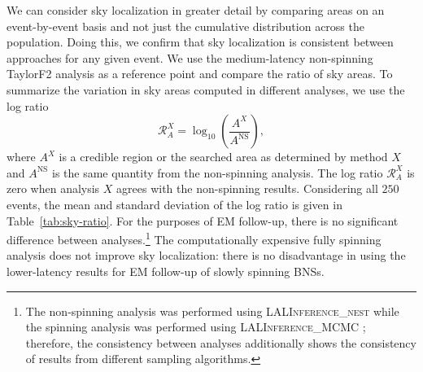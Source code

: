 We can consider sky localization in greater detail by comparing areas on an event-by-event basis and not just the cumulative distribution across the population. Doing this, we confirm that sky localization is consistent between approaches for any given event. We use the medium-latency non-spinning TaylorF2 analysis as a reference point and compare the ratio of sky areas. To summarize the variation in sky areas computed in different analyses, we use the log ratio
\begin{equation}
\mathcal{R}_A^X = \log_{10}\left(\frac{A^X}{A^\mathrm{NS}}\right),
\end{equation}
where $A^X$ is a credible region or the searched area as determined by method $X$ and $A^\mathrm{NS}$ is the same quantity from the non-spinning analysis. The log ratio $\mathcal{R}_A^X$ is zero when analysis $X$ agrees with the non-spinning results. Considering all $250$ events, the mean and standard deviation of the log ratio is given in Table~\ref{tab:sky-ratio}. For the purposes of EM follow-up, there is no significant difference between analyses.\footnote{The non-spinning analysis was performed using \textsc{LALInference\_nest} while the spinning analysis was performed using \textsc{LALInference\_MCMC} \citep{Veitch_2014}; therefore, the consistency between analyses additionally shows the consistency of results from different sampling algorithms.} The computationally expensive fully spinning analysis does not improve sky localization: there is no disadvantage in using the lower-latency results for EM follow-up of slowly spinning BNSs.
  
  
  
  
  
  
  
  